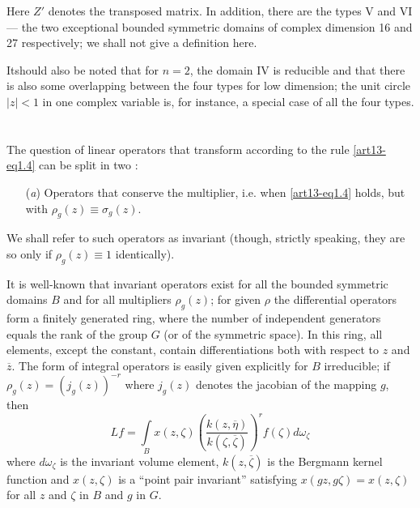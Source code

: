 Here $Z'$ denotes the transposed matrix. In addition, there are the types V and VI --- the two exceptional bounded symmetric domains of complex dimension 16 and 27 respectively; we shall not give a definition here.

It\pageoriginale should also be noted that for $n=2$, the domain IV is reducible and that there is also some overlapping between the four types for low dimension; the unit circle $|z|<1$ in one complex variable is, for instance, a special case of all the four types.

\section{}\label{art13-sec2}
The question of linear operators that transform according to the rule \eqref{art13-eq1.4} can be split in two :
\begin{itemize}
\item[({\em a})] Operators that conserve the multiplier, i.e. when \eqref{art13-eq1.4} holds, but with $\rho_{g}(z)\equiv \sigma_{g}(z)$.
\end{itemize}

We shall refer to such operators as invariant (though, strictly speaking, they are so only if $\rho_{g}(z)\equiv 1$ identically).

It is well-known that invariant operators exist for all the bounded symmetric domains $B$ and for all multipliers $\rho_{g}(z)$; for given $\rho$ the differential operators form a finitely generated ring, where the number of independent generators equals the rank of the group $G$ (or of the symmetric space). In this ring, all elements, except the constant, contain differentiations both with respect to $z$ and $\overline{z}$. The form of integral operators is easily given explicitly for $B$ irreducible; if $\rho_{g}(z)=(j_{g}(z))^{-r}$ where $j_{g}(z)$ denotes the jacobian of the mapping $g$, then
\setcounter{equation}{0}
\begin{equation}
Lf=\int\limits_{B} x(z,\zeta)\left(\frac{k(z,\overline{\eta})}{k(\zeta,\overline{\zeta})}\right)^{r}f(\zeta)d\omega_{\zeta}\label{art13-eq2.1}
\end{equation}
where $d\omega_{\zeta}$ is the invariant volume element, $k(z,\overline{\zeta})$ is the Bergmann kernel function and $x(z,\zeta)$ is a ``point pair invariant'' satisfying $x(gz,g\zeta)=x(z,\zeta)$ for all $z$ and $\zeta$ in $B$ and $g$ in $G$.


